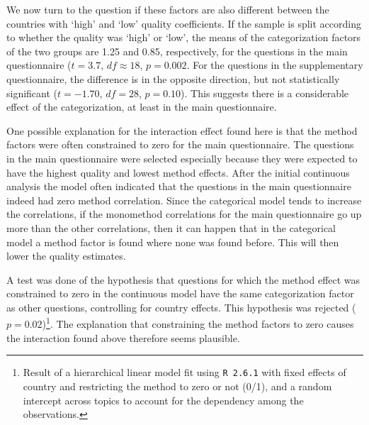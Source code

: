 \documentclass[a4paper,12pt]{article}
\begin{document}

We now turn to the question if these factors are also different between the countries with `high' and `low' quality coefficients. If the sample is split according to whether the quality was `high'  or `low', the means of the categorization factors of the two groups are 1.25 and 0.85, respectively, for the questions in the main questionnaire ($t = 3.7$, $df \approx 18$, $p = 0.002$. For the questions in the supplementary questionnaire, the difference is in the opposite direction, but not statistically significant ($t = -1.70$, $df = 28$, $p = 0.10$). This suggests there is a considerable effect of the categorization, at least in the main questionnaire.

 
One possible explanation for the interaction effect found here is that the method factors were often constrained to zero for the main questionnaire. The questions in the main questionnaire were selected especially because they were expected to have the highest quality and lowest method effects. After the initial continuous analysis the model often indicated that the questions in the main questionnaire indeed had zero method correlation. Since the categorical model tends to increase the correlations, if the monomethod correlations for the main questionnaire go up more than the other correlations, then it can happen that in the categorical model a method factor is found where none was found before. This will then lower the quality estimates.

A test was done of the hypothesis that questions for which the method effect was constrained to zero in the continuous model have the same categorization factor as other questions, controlling for country effects. This hypothesis was rejected ($p=0.02$)\footnote{Result of a hierarchical linear model fit using \texttt{R 2.6.1} with fixed effects of country and restricting the method to zero or not (0/1), and a random intercept across topics to account for the dependency among the observations.}. The explanation that constraining the method factors to zero causes the interaction found above therefore seems plausible.
\end{document}
